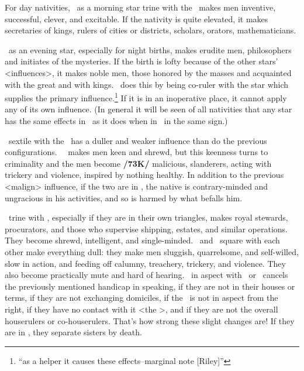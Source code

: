 For day nativities, \Mercury\, \marginnote{\Mercury \Trine \Moon} as a morning star trine with the \Moon\, makes men inventive, successful, clever, and excitable. If the nativity is quite elevated, it makes secretaries of kings, rulers of cities or districts, scholars, orators, mathematicians.

\Mercury\, as an evening star, especially for night births, makes erudite men, philosophers and initiates of the mysteries. If the birth is lofty because of the other stars’ <influences>, it makes noble men, those honored by the masses and acquainted with the great and with kings. \Mercury\, does this by being co-ruler with the star which supplies the primary influence.\footnote{``as a helper it causes these effects--marginal note [Riley]''} If it is in an inoperative place, it cannot apply any of its own influence. (\mndl In general it will be seen of all nativities that any star has the same effects in \Trine\, as it does when in \Conjunction\, in the same sign.)

\Mercury\, sextile with the \Moon\, has a duller and weaker influence than do the previous configurations. \Mercury\, \Square\, makes men keen and shrewd, but this keenness turns to criminality and the men become \textbf{/73K/} malicious, slanderers, acting with trickery and violence, inspired by nothing healthy. In addition to the previous <malign> influence, if the two are in \Opposition, the native is contrary-minded and ungracious in his activities, and so is harmed by what befalls him.

\Mercury\, \marginnote{\Mercury \Trine \Saturn} trine with \Saturn, especially if they are in their own triangles, makes royal stewards, procurators, and those who supervise shipping, estates, and similar operations. They become shrewd, intelligent, and single-minded. \Mercury\, and \Saturn\, square with each other make everything dull: they make men sluggish, quarrelsome, and self-willed, slow in action, and feeding off calumny, treachery, trickery, and violence. They also become practically mute and hard of hearing. \Mars\, in aspect with \Saturn\, or \Mercury\, cancels the previously mentioned handicap in speaking, if they are not in their houses or terms, if they are not exchanging domiciles, if the \Moon\, is not in aspect from the right, if they have no contact with it <the \Moon>, and if they are not the overall houserulers or co-houserulers. \mndl That’s how strong these slight changes are! If they are in \Opposition, they separate sisters by death.

